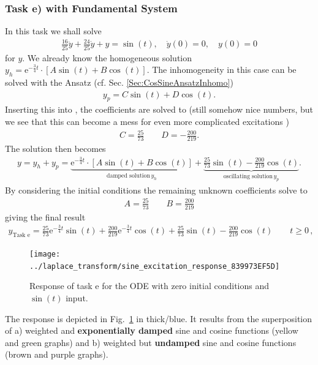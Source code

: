 \documentclass[11pt,a4paper,DIV=12]{scrartcl}
\begin{document}
\subsubsection{Task e) with Fundamental System}
\label{sec:TaskeWithFundamentalSystem}
In this task we shall solve
\begin{align}
\label{eq:InHomoODE_sin}
\frac{16}{25} \ddot{y} + \frac{24}{25} \dot{y} + y = \sin(t), \quad
\dot{y}(0) = 0,\quad y(0)=0
\end{align}
for $y$.
%
We already know the homogeneous solution
$y_h = \mathrm{e}^{-\frac{3}{4} t} \cdot
\left[ A \sin(t) + B \cos(t)\right]$.
%
The inhomogeneity in this case can be solved with the Ansatz (cf.
Sec. \ref{Sec:CosSineAnsatzInhomo})
\begin{align}
y_p = C \sin(t) + D \cos(t).
\end{align}
Inserting this into , the
coefficients are solved to (still somehow nice numbers, but we see that this can
become a mess for even more complicated excitations
)
\begin{align}
C = \frac{25}{73}\qquad D = -\frac{200}{219}.
\end{align}
%
The solution then becomes
\begin{align}
y = y_h + y_p = \underbrace{\mathrm{e}^{-\frac{3}{4} t} \cdot
\left[ A \sin(t) + B \cos(t)\right]}_{\text{damped solution} \, y_h}+
\underbrace{\frac{25}{73} \sin(t) - \frac{200}{219} \cos(t)}_{\text{oscillating solution} \, y_p}.
\end{align}
By considering the initial conditions the remaining unknown coefficients solve to
\begin{align}
A = \frac{25}{73}\qquad B = \frac{200}{219}
\end{align}
giving the final result
\begin{align}
\boxed{
y_\text{Task e} = \frac{25}{73} \mathrm{e}^{-\frac{3}{4} t} \sin(t) +
\frac{200}{219} \mathrm{e}^{-\frac{3}{4} t} \cos(t) +
\frac{25}{73} \sin(t) -
\frac{200}{219} \cos(t) \qquad t\geq 0
}\, ,
\end{align}
%
\begin{figure}[h!]
\centering
\texttt{[image: ../laplace\_transform/sine\_excitation\_response\_839973EF5D]}
\caption{Response of task e for the ODE with zero initial conditions and
$\sin(t)$ input.}
\label{fig:sine_excitation_response}
\end{figure}

The response is depicted in Fig.~\ref{fig:sine_excitation_response} in
thick/blue.
It results from the superposition of a) weighted and \textbf{exponentially damped}
sine and cosine functions (yellow and green graphs) and b) weighted but \textbf{undamped}
sine and cosine functions (brown and purple graphs).
\end{document}
